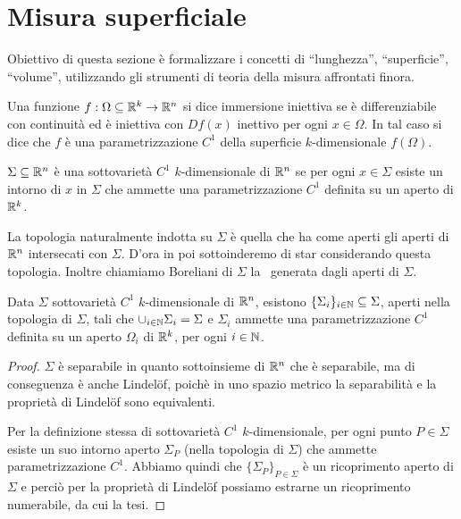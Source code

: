 \section{Misura superficiale}
Obiettivo di questa sezione è formalizzare i concetti di ``lunghezza'', ``superficie'', ``volume'', utilizzando gli strumenti di teoria della misura affrontati finora. 

\begin{definition}
	Una funzione $f:\Omega \subseteq \mathbb R^k\to\mathbb R^n$ si dice immersione iniettiva se è differenziabile con continuità ed è iniettiva con $Df(x)$ inettivo per ogni $x\in\Omega$. In tal caso si dice che $f$ è una parametrizzazione $C^1$ della superficie $k$-dimensionale $f(\Omega)$.
\end{definition}

\begin{definition}
	$\Sigma\subseteq\mathbb R^n$ è una sottovarietà $C^1$ $k$-dimensionale di $\mathbb R^n$ se per ogni $x\in\Sigma$ esiste un intorno di $x$ in $\Sigma$ che ammette una parametrizzazione $C^1$ definita su un aperto di $\mathbb R^k$.
\end{definition}

La topologia naturalmente indotta su $\Sigma$ è quella che ha come aperti gli aperti di $\mathbb R^n$ intersecati con $\Sigma$. D'ora in poi sottoinderemo di star considerando questa topologia. Inoltre chiamiamo Boreliani di $\Sigma$ la \sigalg\ generata dagli aperti di $\Sigma$.

\begin{lemma}\label{lemma:SottovarietaUnioneNumerabile}
	Data $\Sigma$ sottovarietà $C^1$ $k$-dimensionale di $\mathbb R^n$, esistono $\{\Sigma_i\}_{i\in\mathbb N}\subseteq\Sigma$, aperti nella topologia di $\Sigma$, tali che $\cup_{i\in\mathbb N}\Sigma_i=\Sigma$ e $\Sigma_i$ ammette una parametrizzazione $C^1$ definita su un aperto $\Omega_i$ di $\mathbb R^k$, per ogni $i\in\mathbb N$.
\end{lemma}
\begin{proof}
	$\Sigma$ è separabile in quanto sottoinsieme di $\mathbb R^n$ che è separabile, ma di conseguenza è anche Lindelöf, poichè in uno spazio metrico la separabilità e la proprietà di Lindelöf sono equivalenti.
	
	Per la definizione stessa di sottovarietà $C^1$ $k$-dimensionale, per ogni punto $P\in\Sigma$ esiste un suo intorno aperto $\Sigma_P$ (nella topologia di $\Sigma$) che ammette parametrizzazione $C^1$. Abbiamo quindi che $\{\Sigma_P\}_{P\in\Sigma}$ è un ricoprimento aperto di $\Sigma$ e perciò per la proprietà di Lindelöf possiamo estrarne un ricoprimento numerabile, da cui la tesi.
\end{proof}

